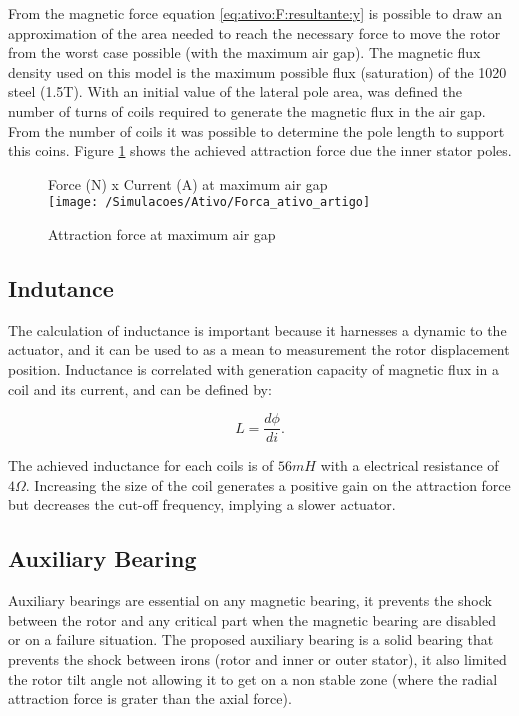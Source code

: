\documentclass[10pt,fleqn,a4paper,twoside]{article}
\begin{document}
	From the magnetic force equation \eqref{eq:ativo:F:resultante:y} is possible to draw an approximation of the area needed to reach the necessary force to move the rotor from the worst case possible (with the maximum air gap). The magnetic flux density used on this model is the maximum possible flux (saturation) of the 1020 steel (1.5T). With an initial value of the lateral pole area, was defined the number of turns of coils required to generate the magnetic flux in the air gap. From the number of coils it was possible to determine the pole length to support this coins. Figure \ref{fig:magnetico:ativo:comsol} shows the achieved attraction force due the inner stator poles.
	
	\begin{figure}
		\centering
		Force (N) x Current (A) at maximum air gap\\
		\texttt{[image: /Simulacoes/Ativo/Forca\_ativo\_artigo]}
		\caption{Attraction force at maximum air gap }
		\label{fig:magnetico:ativo:comsol}
	\end{figure}
	
	\subsection{Indutance} \label{subsec:at:indutancia}
	
	The calculation of inductance is important because it harnesses a dynamic to the actuator, and it can be used to as a mean to measurement the rotor displacement position. Inductance is correlated with generation capacity of magnetic flux in a coil and its current, and can be defined by:
	
	\begin{equation}
		L = \frac{d \phi}{di} .
	\end{equation}
	
	The achieved inductance for each coils is of $56 mH$ with a electrical resistance of $4 \Omega$. Increasing the size of the coil generates a positive gain on the attraction force but decreases the cut-off frequency, implying a slower actuator.
	
	\subsection{Auxiliary Bearing}
	
	Auxiliary bearings are essential on any magnetic bearing, it prevents the shock between the rotor and any critical part when the magnetic bearing are disabled or on a failure situation. The proposed auxiliary bearing is a solid bearing that prevents the shock between irons (rotor and inner or outer stator), it also limited the rotor tilt angle not allowing it to get on a non stable zone (where the radial attraction force is grater than the axial force). 
	
\end{document}
